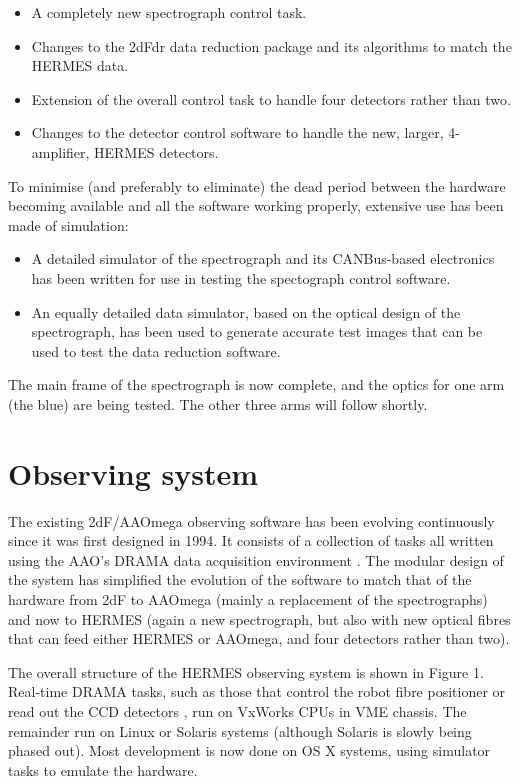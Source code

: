 \begin{itemize}
\itemsep0em
\item A completely new spectrograph control task.
\item Changes to the 2dFdr data reduction package and its algorithms to match the HERMES data.
\item Extension of the overall control task to handle four detectors rather than two.
\item Changes to the detector control software to handle the new, larger, 4-amplifier, HERMES detectors.
\end{itemize}

To minimise (and preferably to eliminate) the dead period between the hardware becoming available and all the software working properly, extensive use has been made of simulation:

\begin{itemize}
\itemsep0em
\item A detailed simulator of the spectrograph and its CANBus-based electronics has been written for use in testing the spectograph control software.
\item An equally detailed data simulator, based on the optical design of the spectrograph, has been used to generate accurate test images that can be used to  test the data reduction software.
\end{itemize}

The main frame of the spectrograph is now complete, and the optics for one arm (the blue) are being tested. The other three arms will follow shortly.

\section{Observing system}

The existing 2dF/AAOmega observing software has been evolving continuously since it was first designed in 1994. It consists of a collection of tasks all written using the AAO's DRAMA data acquisition environment \citep{Drama_1995}. The modular design of the system has simplified the evolution of the software to match that of the hardware from 2dF to AAOmega (mainly a replacement of the spectrographs) and now to HERMES (again a new spectrograph, but also with new optical fibres that can feed either HERMES or AAOmega, and four detectors rather than two).

The overall structure of the HERMES observing system is shown in Figure 1. Real-time DRAMA tasks, such as those that control the robot fibre positioner or read out the CCD detectors \citep{AAO2_2004},  run on VxWorks CPUs in VME chassis. The remainder run on Linux or Solaris systems (although Solaris is slowly being phased out). Most development is now done on OS X systems, using simulator tasks to emulate the hardware.

